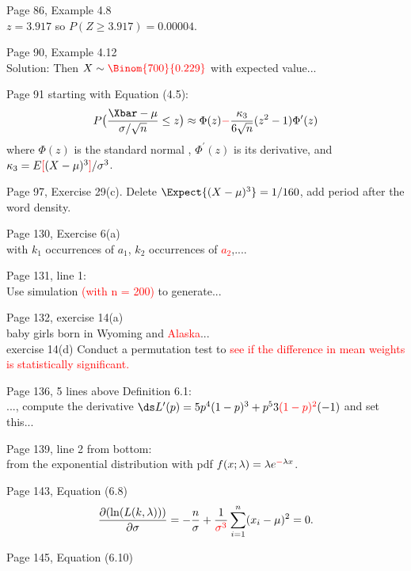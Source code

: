 \documentclass[11pt]{article}
\begin{document}
\bigskip %
Page 86, Example 4.8\\
$z=3.917$ so $P(Z \ge 3.917) = 0.00004$.

\bigskip %
Page 90, Example 4.12\\
Solution: Then $X \sim \textcolor{red}{\Binom{700}{0.229}}$ with expected value...

\bigskip %
Page 91 starting with Equation (4.5):
\[
P\bigl(\frac{\Xbar-\mu}{\sigma/\sqrt{n}}\le z\bigr)
\approx \Phi(z) \textcolor{red}{-} \frac{\kappa_3}{6\sqrt{n}}(z^2-1)\Phi^\prime(z)
\]
where $\Phi(z)$ is the standard normal {\color{red}{CDF}}, $\Phi^\prime(z)$ is its
derivative, and $\kappa_3=E\textcolor{red}{[}(X-\mu)^3\textcolor{red}{]}/\sigma^3$.


\bigskip
Page 97, Exercise 29(c). Delete $\Expect{(X-\mu)^3}=1/160$, add period after the word
density.

\bigskip
Page 130, Exercise 6(a)\\
 with $k_1$ occurrences of $a_1$,
$k_2$ occurrences of \textcolor{red}{$a_2$},....

\bigskip
Page 131, line 1: \\
Use simulation \textcolor{red}{(with n = 200)} to generate...

\bigskip
Page 132, exercise 14(a)\\
baby girls born in Wyoming and \textcolor{red}{Alaska}...\\
exercise 14(d) Conduct a permutation test to \textcolor{red}{see if the
difference in mean weights is statistically significant.}

\bigskip %
Page 136, 5 lines above Definition 6.1: \\
..., compute the derivative
$\ds L^\prime(p) = 5p^4(1-p)^3 + p^5 3\textcolor{red}{(1-p)^2}(-1)$ and set this...


\bigskip
Page 139, line 2 from bottom: \\
from the exponential distribution with pdf $f(x; \lambda)=\lambda e^{\textcolor{red}{-}\lambda x}$.

\bigskip %
Page 143, Equation (6.8)\\
\[
\frac{\partial(\ln(L(k,\lambda)))}{\partial \sigma}=
-\frac{n}{\sigma} + \frac{1}{\textcolor{red}{\sigma^3}}\sum_{i=1}^n(x_i-\mu)^2=0.
\]


\bigskip
Page 145, Equation (6.10)
\end{document}
